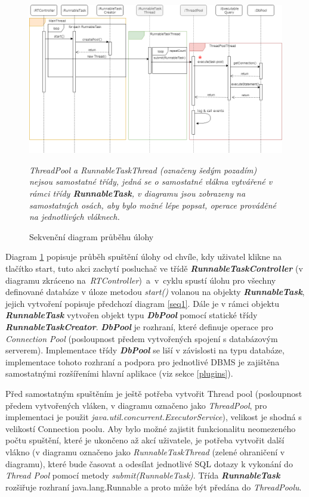 \documentclass[czech,bachelor,public,dept460,male,cpdeclaration,twoside]{diploma}
\begin{document}
\newpage


\begin{figure}[!htbp]\centering\includegraphics[width=1.0\textwidth]{Figures/runtask.png}\caption{Sekvenční diagram průběhu úlohy}
\label{seqruntask}

\textit{ThreadPool a RunnableTaskThread (označeny šedým pozadím) nejsou samostatné třídy, jedná se o samostatné vlákna vytvářené v rámci třídy \textbf{\emph{RunnableTask}}, v diagramu jsou zobrazeny na samostatných osách, aby bylo možné lépe popsat, operace prováděné na jednotlivých vláknech. }
\end{figure}


Diagram \ref{seqruntask} popisuje průběh spuštění úlohy od chvíle, kdy uživatel klikne na tlačítko start, tuto akci zachytí posluchač ve třídě \textbf{\emph{RunnableTaskController}} (v diagramu zkráceno na~\textit{RTController})~a~v~cyklu spustí úlohu pro všechny definované databáze v úloze metodou \textit{start()} volanou na objekty \textbf{\emph{RunnableTask}}, jejich vytvoření popisuje předchozí diagram \ref{seq1}. Dále je v rámci objektu \textbf{\emph{RunnableTask}} vytvořen objekt typu \textbf{\emph{DbPool}} pomocí statické třídy \textbf{\emph{RunnableTaskCreator}}. \textbf{\emph{DbPool}} je rozhraní, které definuje operace pro \textit{Connection Pool} (posloupnost předem vytvořených spojení s databázovým serverem). Implementace třídy \textbf{\emph{DbPool}} se liší v závislosti na typu databáze, implementace tohoto rozhraní a podpora pro jednotlivé DBMS je zajištěna samostatnými rozšířeními hlavní aplikace (viz sekce \ref{plugins}).

Před samostatným spuštěním je ještě potřeba vytvořit Thread pool (posloupnost předem vytvořených vláken, v diagramu označeno jako \textit{ThreadPool}, pro implementaci je použit \newline \textit{java.util.concurrent.ExecutorService}), velikost je shodná s velikostí Connection poolu. Aby bylo možné zajistit funkcionalitu neomezeného počtu spuštění, které je ukončeno až akcí uživatele, je potřeba vytvořit další vlákno (v diagramu označeno jako \textit{RunnableTaskThread} (zelené ohraničení v diagramu), které bude časovat a odesílat jednotlivé SQL dotazy k vykonání do \textit{Thread Pool} pomocí metody \textit{submit(RunnableTask)}. Třída \textbf{\emph{RunnableTask}} rozšiřuje rozhraní java.lang.Runnable a proto může být předána do \textit{ThreadPoolu}.
\end{document}
